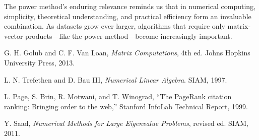 \documentclass[11pt,a4paper]{article}
\begin{document}
The power method's enduring relevance reminds us that in numerical computing, simplicity, theoretical understanding, and practical efficiency form an invaluable combination. As datasets grow ever larger, algorithms that require only matrix-vector products---like the power method---become increasingly important.

\begin{thebibliography}{9}

G. H. Golub and C. F. Van Loan, \textit{Matrix Computations}, 4th ed. Johns Hopkins University Press, 2013.

L. N. Trefethen and D. Bau III, \textit{Numerical Linear Algebra}. SIAM, 1997.

L. Page, S. Brin, R. Motwani, and T. Winograd, ``The PageRank citation ranking: Bringing order to the web,'' Stanford InfoLab Technical Report, 1999.

Y. Saad, \textit{Numerical Methods for Large Eigenvalue Problems}, revised ed. SIAM, 2011.

\end{thebibliography}
\end{document}
